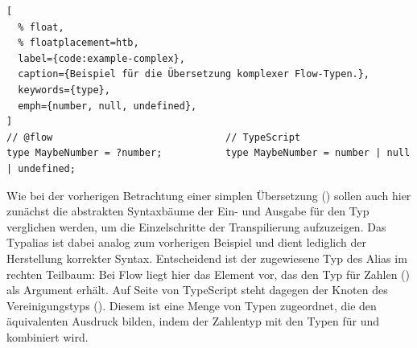\begin{lstlisting}[
  % float,
  % floatplacement=htb,
  label={code:example-complex},
  caption={Beispiel für die Übersetzung komplexer Flow-Typen.},
  keywords={type},
  emph={number, null, undefined},
]
// @flow                              // TypeScript
type MaybeNumber = ?number;           type MaybeNumber = number | null | undefined;
\end{lstlisting}

Wie bei der vorherigen Betrachtung einer simplen Übersetzung () sollen auch hier zunächst die abstrakten Syntaxbäume der Ein- und Ausgabe für den Typ  verglichen werden, um die Einzelschritte der Transpilierung aufzuzeigen. Das Typalias ist dabei analog zum vorherigen Beispiel und dient lediglich der Herstellung korrekter Syntax. Entscheidend ist der zugewiesene Typ des Alias im rechten Teilbaum: Bei Flow liegt hier das Element  vor, das den Typ für Zahlen () als Argument erhält. Auf Seite von TypeScript steht dagegen der Knoten des Vereinigungstyps (). Diesem ist eine Menge von Typen zugeordnet, die den äquivalenten Ausdruck bilden, indem der Zahlentyp mit den Typen für  und  kombiniert wird.

